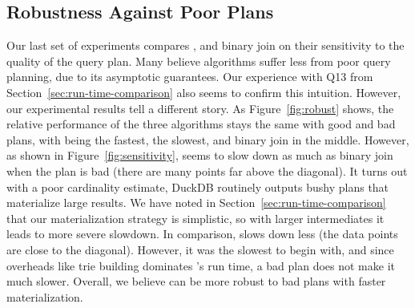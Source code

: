\subsection{Robustness Against Poor Plans}\label{sec:robustness}

Our last set of experiments compares \FJ, \GJ and binary join 
  on their sensitivity to the quality of the query plan.
Many believe \WCOJ algorithms suffer less from poor query planning,
  due to its asymptotic guarantees.
Our experience with Q13 from Section~\ref{sec:run-time-comparison}
  also seems to confirm this intuition.
However, our experimental results tell a different story.
As Figure~\ref{fig:robust} shows, 
  the relative performance of the three algorithms stays 
  the same with good and bad plans, with \FJ being the fastest,
  \GJ the slowest, and binary join in the middle.
However, as shown in Figure~\ref{fig:sensitivity},
  \FJ seems to slow down as much as binary join 
  when the plan is bad (there are many points far above the diagonal).
It turns out with a poor cardinality estimate, 
  DuckDB routinely outputs bushy plans that materialize large results.
We have noted in Section~\ref{sec:run-time-comparison} that 
  our materialization strategy is simplistic, 
  so with larger intermediates it leads to more severe slowdown.
In comparison, \GJ slows down less (the data points are close to the diagonal).
However, it was the slowest to begin with,
  and since overheads like trie building dominates \GJ's run time, 
  a bad plan does not make it much slower.
Overall, we believe \FJ can be more robust to bad plans with 
  faster materialization.

